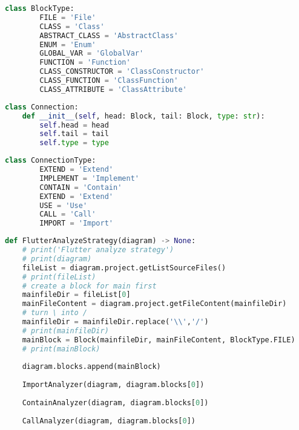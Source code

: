 \begin{lstlisting}[language=Python, caption={$\texttt{BlockType}$ class (Enumerate).}, label={lst:5}]
    class BlockType:
        FILE = 'File'
        CLASS = 'Class'
        ABSTRACT_CLASS = 'AbstractClass'
        ENUM = 'Enum'
        GLOBAL_VAR = 'GlobalVar'
        FUNCTION = 'Function'
        CLASS_CONSTRUCTOR = 'ClassConstructor'
        CLASS_FUNCTION = 'ClassFunction'
        CLASS_ATTRIBUTE = 'ClassAttribute'
\end{lstlisting}

\begin{lstlisting}[language=Python, caption={$\texttt{Connection}$ class.}, label={lst:6}]
    class Connection:
    def __init__(self, head: Block, tail: Block, type: str):
        self.head = head
        self.tail = tail
        self.type = type
\end{lstlisting}

\begin{lstlisting}[language=Python, caption={$\texttt{ConnectionType}$ class (Enumerate).}, label={lst:7}]
    class ConnectionType:
        EXTEND = 'Extend'
        IMPLEMENT = 'Implement'
        CONTAIN = 'Contain'
        EXTEND = 'Extend'
        USE = 'Use'
        CALL = 'Call'
        IMPORT = 'Import'
\end{lstlisting}

\begin{lstlisting}[language=Python, caption={$\texttt{FlutterAnalyzeStrategy}$ function.}, label={lst:8}]
    def FlutterAnalyzeStrategy(diagram) -> None:
    # print('Flutter analyze strategy')
    # print(diagram)
    fileList = diagram.project.getListSourceFiles()
    # print(fileList)
    # create a block for main first
    mainfileDir = fileList[0]
    mainFileContent = diagram.project.getFileContent(mainfileDir)
    # turn \ into /
    mainfileDir = mainfileDir.replace('\\','/')
    # print(mainfileDir)
    mainBlock = Block(mainfileDir, mainFileContent, BlockType.FILE)
    # print(mainBlock)
    
    diagram.blocks.append(mainBlock)
    
    ImportAnalyzer(diagram, diagram.blocks[0])
    
    ContainAnalyzer(diagram, diagram.blocks[0])
    
    CallAnalyzer(diagram, diagram.blocks[0])
\end{lstlisting}

